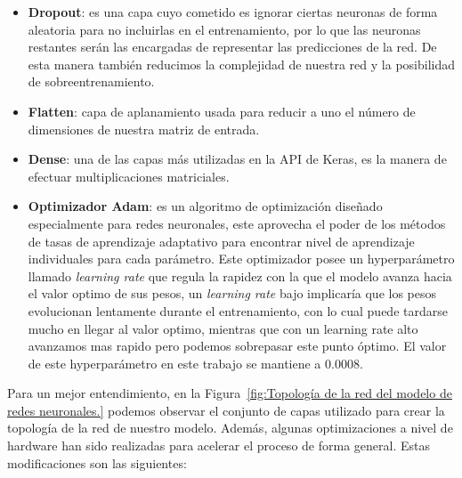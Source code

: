 \begin{itemize}
    \item \textbf{Dropout}: es una capa cuyo cometido es ignorar ciertas neuronas de forma aleatoria para no incluirlas en el entrenamiento, por lo que las neuronas restantes serán las encargadas de representar las predicciones de la red.
    De esta manera también reducimos la complejidad de nuestra red y la posibilidad de sobreentrenamiento.
    \item \textbf{Flatten}: capa de aplanamiento usada para reducir a uno el número de dimensiones de nuestra matriz de entrada.
    \item \textbf{Dense}: una de las capas más utilizadas en la API de Keras, es la manera de efectuar multiplicaciones matriciales.
    \item \textbf{Optimizador Adam}: es un algoritmo de optimización diseñado especialmente para redes neuronales, este aprovecha el poder de los métodos de tasas de aprendizaje adaptativo para encontrar nivel de aprendizaje individuales para cada parámetro.
    Este optimizador posee un hyperparámetro llamado \textit{learning rate} que regula la rapidez con la que el modelo avanza hacia el valor optimo de sus pesos,
    un \textit{learning rate} bajo implicaría que los pesos evolucionan lentamente durante el entrenamiento, con lo cual puede tardarse mucho en llegar al valor optimo, mientras que con un learning rate alto avanzamos mas rapido pero podemos sobrepasar
    este punto óptimo. El valor de este hyperparámetro en este trabajo se mantiene a 0.0008.

\end{itemize}

Para un mejor entendimiento, en la Figura~\ref{fig:Topología de la red del modelo de redes neuronales.} podemos observar el conjunto de capas utilizado para crear la topología de la red de nuestro modelo. Además, algunas optimizaciones a nivel de hardware han sido realizadas para acelerar el proceso de forma general. Estas modificaciones son las siguientes:

